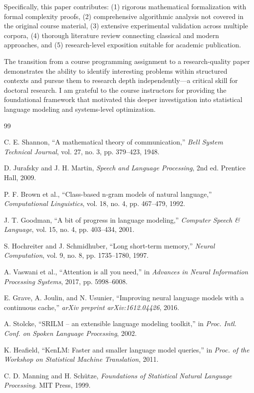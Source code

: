 \documentclass[11pt,letterpaper]{article}
\begin{document}
Specifically, this paper contributes: (1) rigorous mathematical formalization with formal complexity proofs, (2) comprehensive algorithmic analysis not covered in the original course material, (3) extensive experimental validation across multiple corpora, (4) thorough literature review connecting classical and modern approaches, and (5) research-level exposition suitable for academic publication.

The transition from a course programming assignment to a research-quality paper demonstrates the ability to identify interesting problems within structured contexts and pursue them to research depth independently—a critical skill for doctoral research. I am grateful to the course instructors for providing the foundational framework that motivated this deeper investigation into statistical language modeling and systems-level optimization.

\begin{thebibliography}{99}

C. E. Shannon, ``A mathematical theory of communication,''
\textit{Bell System Technical Journal}, vol. 27, no. 3, pp. 379--423, 1948.

D. Jurafsky and J. H. Martin,
\textit{Speech and Language Processing}, 2nd ed.
Prentice Hall, 2009.

P. F. Brown et al., ``Class-based n-gram models of natural language,''
\textit{Computational Linguistics}, vol. 18, no. 4, pp. 467--479, 1992.

J. T. Goodman, ``A bit of progress in language modeling,''
\textit{Computer Speech \& Language}, vol. 15, no. 4, pp. 403--434, 2001.

S. Hochreiter and J. Schmidhuber, ``Long short-term memory,''
\textit{Neural Computation}, vol. 9, no. 8, pp. 1735--1780, 1997.

A. Vaswani et al., ``Attention is all you need,''
in \textit{Advances in Neural Information Processing Systems}, 2017, pp. 5998--6008.

E. Grave, A. Joulin, and N. Usunier, ``Improving neural language models with a continuous cache,''
\textit{arXiv preprint arXiv:1612.04426}, 2016.

A. Stolcke, ``SRILM -- an extensible language modeling toolkit,''
in \textit{Proc. Intl. Conf. on Spoken Language Processing}, 2002.

K. Heafield, ``KenLM: Faster and smaller language model queries,''
in \textit{Proc. of the Workshop on Statistical Machine Translation}, 2011.

C. D. Manning and H. Schütze,
\textit{Foundations of Statistical Natural Language Processing}.
MIT Press, 1999.

\end{thebibliography}
\end{document}
